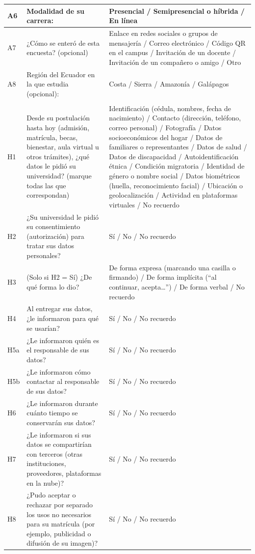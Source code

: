 {\begin{xltabular}{\textwidth}{|>{\raggedright\arraybackslash}p{1.1cm}|>{\raggedright\arraybackslash}X|>{\raggedright\arraybackslash}p{4.6cm}|}
  A6 & Modalidad de su carrera: & Presencial / Semipresencial o híbrida / En línea \\ \hline
  A7 & ¿Cómo se enteró de esta encuesta? (opcional) & Enlace en redes sociales o grupos de mensajería / Correo electrónico / Código QR en el campus / Invitación de un docente / Invitación de un compañero o amigo / Otro \\ \hline
  A8 & Región del Ecuador en la que estudia (opcional): & Costa / Sierra / Amazonía / Galápagos \\ \hline
   \\ \hline
  H1 & Desde su postulación hasta hoy (admisión, matrícula, becas, bienestar, aula virtual u otros trámites), ¿qué datos le pidió su universidad? (marque todas las que correspondan) & Identificación (cédula, nombres, fecha de nacimiento) / Contacto (dirección, teléfono, correo personal) / Fotografía / Datos socioeconómicos del hogar / Datos de familiares o representantes / Datos de salud / Datos de discapacidad / Autoidentificación étnica / Condición migratoria / Identidad de género o nombre social / Datos biométricos (huella, reconocimiento facial) / Ubicación o geolocalización / Actividad en plataformas virtuales / No recuerdo \\ \hline
  H2 & ¿Su universidad le pidió su consentimiento (autorización) para tratar sus datos personales? & Sí / No / No recuerdo \\ \hline
  H3 & (Solo si H2 = Sí) ¿De qué forma lo dio? & De forma expresa (marcando una casilla o firmando) / De forma implícita (\textquotedblleft{}al continuar, acepta\ldots\textquotedblright{}) / De forma verbal / No recuerdo \\ \hline
  H4 & Al entregar sus datos, ¿le informaron para qué se usarían? & Sí / No / No recuerdo \\ \hline
  H5a & ¿Le informaron quién es el responsable de sus datos? & Sí / No / No recuerdo \\ \hline
  H5b & ¿Le informaron cómo contactar al responsable de sus datos? & Sí / No / No recuerdo \\ \hline
  H6 & ¿Le informaron durante cuánto tiempo se conservarán sus datos? & Sí / No / No recuerdo \\ \hline
  H7 & ¿Le informaron si sus datos se compartirían con terceros (otras instituciones, proveedores, plataformas en la nube)? & Sí / No / No recuerdo \\ \hline
  H8 & ¿Pudo aceptar o rechazar por separado los usos no necesarios para su matrícula (por ejemplo, publicidad o difusión de su imagen)? & Sí / No / No recuerdo \\ \hline

\end{xltabular}}
